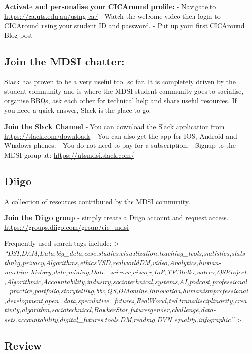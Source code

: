 \documentclass[]{book}
\theoremstyle{definition}
\theoremstyle{definition}
\theoremstyle{remark}
\begin{document}
\textbf{Activate and personalise your CICAround profile:} - Navigate to
\url{https://ca.uts.edu.au/using-ca/} - Watch the welcome video then
login to CICAround using your student ID and password. - Put up your
first CICAround Blog post

\subsection{Join the MDSI chatter:}\label{join-the-mdsi-chatter}

Slack has proven to be a very useful tool so far. It is completely
driven by the student community and is where the MDSI student community
goes to socialise, organise BBQs, ask each other for technical help and
share useful resources. If you need a quick answer, Slack is the place
to go.

\textbf{Join the Slack Channel} - You can download the Slack application
from \url{https://slack.com/downloads} - You can also get the app for
IOS, Android and Windows phones. - You do not need to pay for a
subscription. - Signup to the MDSI group at:
\url{https://utsmdsi.slack.com/}

\subsection{Diigo}\label{diigo}

A collection of resources contributed by the MDSI community.

\textbf{Join the Diigo group} - simply create a Diigo account and
request access. \url{https://groups.diigo.com/group/cic_mdsi}

Frequently used search tags include: \textgreater{}
\emph{``DSI,DAM,Data,big\_data,case,studies,visualization,teaching\_tools,statistics,stats-thnkg,privacy,Algorithms,ethicsVSD,realworldDM,video,Analytics,human-machine,history,data,mining,Data\_science,cisco,r,IoE,TEDtalks,values,QSProject,Algorithmic,Accountability,industry,sociotechnical,systems,AI,podcast,professional\_practice,portfolio,storytelling,bbc,QS,DMonline,innovation,humanismprofessional,development,open\_data,speculative\_futures,RealWorld,ted,transdisciplinarity,creativity,algorithm,sociotechnical,BowkerStar,futuresgender,challenge,data-sets,accountability,digital\_futures,tools,DM,reading,DVN,equality,infographic''}
\textgreater{}

\subsection{Review}\label{review}
\end{document}
